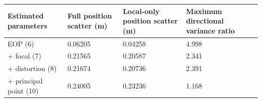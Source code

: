 \begin{tabular}{llll}
\hline
Estimated parameters & Full position scatter (m) & Local-only position scatter (m) & Maximum directional variance ratio \\
\hline
EOP (6) & 0.06205 & 0.04258 & 4.998 \\
+ focal (7) & 0.21565 & 0.20587 & 2.341 \\
+ distortion (8) & 0.21674 & 0.20736 & 2.391 \\
+ principal point (10) & 0.24005 & 0.23236 & 1.168 \\
\hline
\end{tabular}

